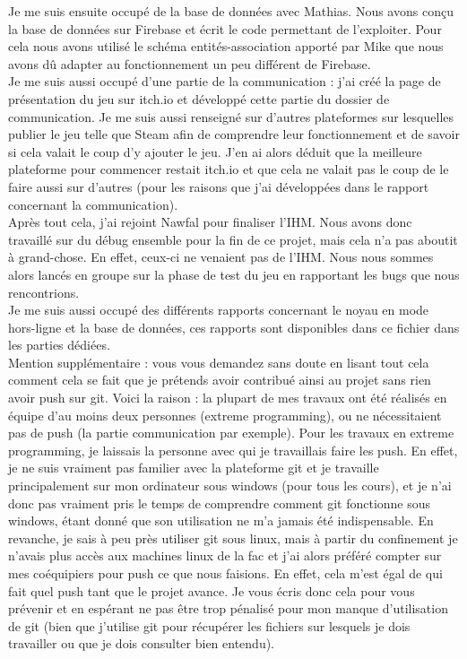 \documentclass[a4paper,11pt]{article}
\begin{document}
\newpage

Je me suis ensuite occupé de la base de données avec Mathias. Nous avons conçu la base de données sur Firebase et écrit le code permettant de l’exploiter. Pour cela nous avons utilisé le schéma entités-association apporté par Mike que nous avons dû adapter au fonctionnement un peu différent de Firebase. \\

Je me suis aussi occupé d’une partie de la communication : j’ai créé la page de présentation du jeu sur itch.io et développé cette partie du dossier de communication. Je me suis aussi renseigné sur d’autres plateformes sur lesquelles publier le jeu telle que Steam afin de comprendre leur fonctionnement et de savoir si cela valait le coup d’y ajouter le jeu. J’en ai alors déduit que la meilleure plateforme pour commencer restait itch.io et que cela ne valait pas le coup de le faire aussi sur d’autres (pour les raisons que j’ai développées dans le rapport concernant la communication). \\

Après tout cela, j’ai rejoint Nawfal pour finaliser l’IHM. Nous avons donc travaillé sur du débug ensemble pour la fin de ce projet, mais cela n’a pas aboutit à grand-chose. En effet, ceux-ci ne venaient pas de l’IHM. Nous nous sommes alors lancés en groupe sur la phase de test du jeu en rapportant les bugs que nous rencontrions. \\

Je me suis aussi occupé des différents rapports concernant le noyau en mode hors-ligne et la base de données, ces rapports sont disponibles dans ce fichier dans les parties dédiées. \\

Mention supplémentaire : vous vous demandez sans doute en lisant tout cela comment cela se fait que je prétends avoir contribué ainsi au projet sans rien avoir push sur git. Voici la raison : la plupart de mes travaux ont été réalisés en équipe d’au moins deux personnes (extreme programming), ou ne nécessitaient pas de push (la partie communication par exemple). Pour les travaux en extreme programming, je laissais la personne avec qui je travaillais faire les push. En effet, je ne suis vraiment pas familier avec la plateforme git et je travaille principalement sur mon ordinateur sous windows (pour tous les cours), et je n’ai donc pas vraiment pris le temps de comprendre comment git fonctionne sous windows, étant donné que son utilisation ne m’a jamais été indispensable. En revanche, je sais à peu près utiliser git sous linux, mais à partir du confinement je n’avais plus accès aux machines linux de la fac et j’ai alors préféré compter sur mes coéquipiers pour push ce que nous faisions. En effet, cela m’est égal de qui fait quel push tant que le projet avance. Je vous écris donc cela pour vous prévenir et en espérant ne pas être trop pénalisé pour mon manque d’utilisation de git (bien que j’utilise git pour récupérer les fichiers sur lesquels je dois travailler ou que je dois consulter bien entendu). \\
\end{document}
